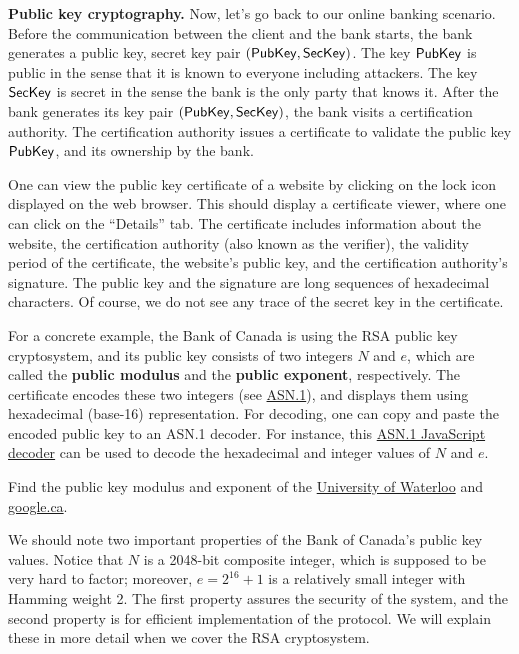 {\bf Public key cryptography.} Now, let’s go back to our online banking scenario. Before the communication between the client and the bank starts, the bank generates a public key, secret key pair $({\sf PubKey}, {\sf SecKey})$. The key ${\sf PubKey}$ is public in the sense that it is known to everyone including attackers. The key ${\sf SecKey}$ is secret in the sense the bank is the only party that knows it. After the bank generates its key pair $({\sf PubKey}, {\sf SecKey})$, the bank visits a certification authority. The certification authority issues a certificate to validate the public key ${\sf PubKey}$, and its ownership by the bank.

One can view the public key certificate of a website by clicking on the lock icon displayed on the 
web browser. This should display a certificate viewer, where one can click on the ``Details'' tab. 
The certificate includes information about the website, the certification authority (also known as the verifier), the validity period of the certificate, the website’s public key, and the certification authority’s signature. The public key and the signature are long sequences of hexadecimal characters.
Of course, we do not see any trace of the secret key in the certificate.

For a concrete example, the Bank of Canada is using the RSA public key cryptosystem, and its public key consists of two integers $N$ and $e$, which are called the {\bf public modulus} and the {\bf public exponent}, respectively. The certificate encodes these two integers (see \href{https://en.wikipedia.org/wiki/ASN.1}{ASN.1}), and displays them using hexadecimal (base-16) representation. For decoding, one can copy and paste the encoded public key to an ASN.1 decoder. For instance, this \href{https://lapo.it/asn1js/}{ASN.1 JavaScript decoder} can be used to decode the hexadecimal and integer values of $N$ and $e$.

\begin{exercise*}
Find the public key modulus and exponent of the \href{https://uwaterloo.ca/}{University of Waterloo} and \href{google.ca}{google.ca}.
\end{exercise*}

We should note two important properties of the Bank of Canada’s public key values. 
Notice that $N$ is a 2048-bit composite integer, which is supposed to be very hard to factor; 
moreover, $e=2^{16}+1$ is a relatively small integer with Hamming weight 2. The first property assures the security of the system, and the second property is for efficient implementation of the protocol. We will explain these in more detail when we cover the RSA cryptosystem.

